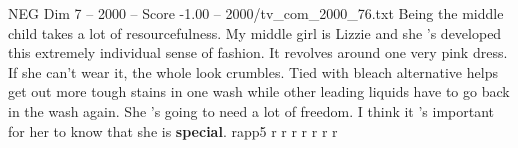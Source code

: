 \begin{textsample}{NEG Dim 7 – 2000 – Score -1.00 – 2000/tv\_com\_2000\_76.txt}  \label{ex:f7_neg_038}
Being the middle child takes a lot of resourcefulness.
My middle girl is Lizzie and she 's developed this extremely individual sense of fashion.
It revolves around one very pink dress.
If she can't wear it, the whole look crumbles.
Tied with bleach alternative helps get out more tough stains in one wash while other leading liquids have to go back in the wash again.
She 's going to need a lot of freedom.
I think it 's important for her to know that she is \textbf{special}. rapp5 r r r r r r r

\end{textsample}
